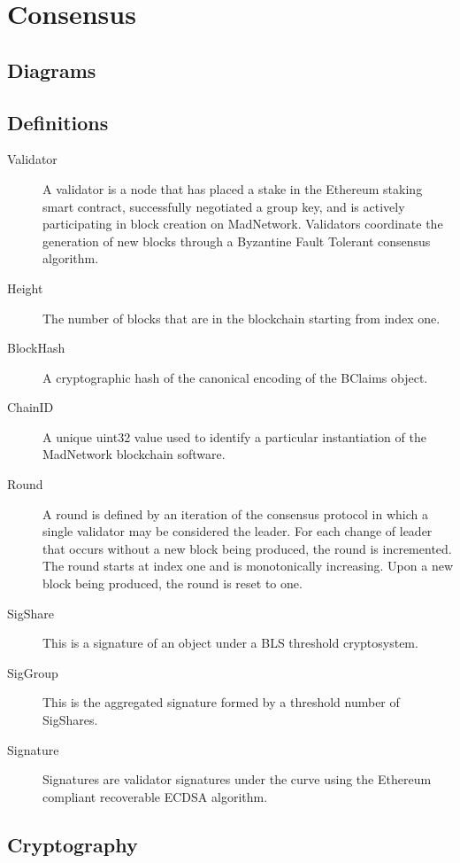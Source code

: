 \section{Consensus}

\subsection{Diagrams}



\subsection{Definitions}

\begin{description}
\item [Validator] A validator is a node that has placed a stake in the
    Ethereum staking smart contract, successfully negotiated a group key,
    and is actively participating in block creation on MadNetwork.
    Validators coordinate the generation of new blocks through a
    Byzantine Fault Tolerant consensus algorithm.
\item [Height]
    The number of blocks that are in the blockchain starting from index one.
\item [BlockHash] A cryptographic hash of the canonical encoding
    of the BClaims object.
\item [ChainID] A unique uint32 value used to identify a particular
    instantiation of the MadNetwork blockchain software.
\item [Round] A round is defined by an iteration of the consensus
    protocol in which a single validator may be considered the leader.
    For each change of leader that occurs without a new block being
    produced, the round is incremented.
    The round starts at index one and is monotonically increasing.
    Upon a new block being produced, the round is reset to one.
\item [SigShare] This is a signature of an object under a BLS threshold
    cryptosystem.
\item [SigGroup] This is the aggregated signature formed by a threshold
    number of SigShares.
\item [Signature] Signatures are validator signatures under the
    \secp{} curve using the Ethereum compliant recoverable ECDSA algorithm.
\end{description}


\subsection{Cryptography}

